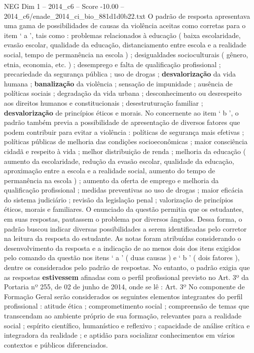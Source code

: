 \begin{textsample}{NEG Dim 1 – 2014\_c6 – Score -10.00 – 2014\_c6/enade\_2014\_ci\_bio\_881d1d0b22.txt}
O padrão de resposta apresentava uma gama de possibilidades de causas da violência aceitas como corretas para o item ‘ a ’, tais como : problemas relacionados à educação ( baixa escolaridade, evasão escolar, qualidade da educação, distanciamento entre escola e a realidade social, tempo de permanência na escola ) ; desigualdades socioculturais ( gênero, etnia, economia, etc. ) ; desemprego e falta de qualificação profissional ; precariedade da segurança pública ; uso de drogas ; \textbf{desvalorização} da vida humana ; \textbf{banalização} da violência ; sensação de impunidade ; ausência de políticas sociais ; degradação da vida urbana ; desconhecimento ou desrespeito aos direitos humanos e constitucionais ; desestruturação familiar ; \textbf{desvalorização} de princípios éticos e morais.
No concernente ao item ‘ b ’, o padrão também previa a possibilidade de apresentação de diversos fatores que podem contribuir para evitar a violência : políticas de segurança mais efetivas ; políticas públicas de melhoria das condições socioeconômicas ; maior consciência cidadã e respeito à vida ; melhor distribuição de renda ; melhoria da educação ( aumento da escolaridade, redução da evasão escolar, qualidade da educação, aproximação entre a escola e a realidade social, aumento do tempo de permanência na escola ) ; aumento da oferta de emprego e melhoria da qualificação profissional ; medidas preventivas ao uso de drogas ; maior eficácia do sistema judiciário ; revisão da legislação penal ; valorização de princípios éticos, morais e familiares.
O enunciado da questão permitia que os estudantes, em suas respostas, pautassem o problema por diversos ângulos.
Dessa forma, o padrão buscou indicar diversas possibilidades a serem identificadas pelo corretor na leitura da resposta do estudante.
As notas foram atribuídas considerando o desenvolvimento da resposta e a indicação de ao menos dois dos itens exigidos pelo comando da questão nos itens ‘ a ’ ( duas causas ) e ‘ b ’ ( dois fatores ), dentre os considerados pelo padrão de respostas.
No entanto, o padrão exigia que as respostas \textbf{estivessem} afinadas com o perfil profissional previsto no Art. 3º da Portaria nº 255, de 02 de junho de 2014, onde se lê : Art. 3º No componente de Formação Geral serão considerados os seguintes elementos integrantes do perfil profissional : atitude ética ; comprometimento social ; compreensão de temas que transcendam ao ambiente próprio de sua formação, relevantes para a realidade social ; espírito científico, humanístico e reflexivo ; capacidade de análise crítica e integradora da realidade ; e aptidão para socializar conhecimentos em vários contextos e públicos diferenciados.

\end{textsample}
